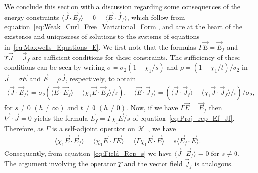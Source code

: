 \documentclass{cmslatex}
\begin{document}
We conclude this section with a discussion regarding some 
consequences of the energy constraints
$\langle\vec{J}\cdot\vec{E}_f\rangle=0=\langle\vec{E}\cdot\vec{J}_f\rangle$, which follow from
equation~\eqref{eq:Weak_Curl_Free_Variational_Form}, and are at the
heart of the existence and uniqueness of solutions to the systems of
equations in~\eqref{eq:Maxwells_Equations_E}. We first note that the
formulas $\Gamma\vec{E}=\vec{E}_f$ and $\Upsilon\vec{J}=\vec{J}_f$ are sufficient
conditions for these constraints. The sufficiency of these conditions
can be seen by writing $\sigma=\sigma_2(1-\chi_1/s)$ and $\rho=(1-\chi_1/t)/\sigma_2$ in
$\vec{J}=\sigma\vec{E}$ and $\vec{E}=\rho\vec{J}$, respectively, to obtain           
% 
\begin{align}\label{eq:Field_Rep_s}
  \langle\vec{J}\cdot\vec{E}_f\rangle=\sigma_2(\langle\vec{E}\cdot\vec{E}_f\rangle-\langle\chi_1\vec{E}\cdot\vec{E}_f\rangle/s),
 \quad
  \langle\vec{E}\cdot\vec{J}_f\rangle=(\langle\vec{J}\cdot\vec{J}_f\rangle-\langle\chi_1\vec{J}\cdot\vec{J}_f\rangle/t)/\sigma_2, 
\end{align}
%
for $s\neq0$ $(h\neq\infty)$ and $t\neq0$ $(h\neq0)$. Now, if we have
$\Gamma\vec{E}=\vec{E}_f$ then $\vec{\nabla}\cdot\vec{J}=0$ yields the formula
$\vec{E}_f=\Gamma\chi_1\vec{E}/s$ of
equation~\eqref{eq:Proj_rep_Ef_Jf}. Therefore, as $\Gamma$ is a
self-adjoint  operator on
$\mathscr{H}$~\cite{Golden:CMP-473,Stakgold:BVP:2000,Stone:64,Folland:95},
we have       
%
\begin{align}\label{eq:Suff_Cond}
  \langle\chi_1\vec{E}\cdot\vec{E}_f\rangle=\langle\chi_1\vec{E}\cdot\Gamma\vec{E}\rangle
                    =\langle\Gamma\chi_1\vec{E}\cdot\vec{E}\rangle
                    =s\langle\vec{E}_f\cdot\vec{E}\rangle.
\end{align}
%
Consequently, from equation~\eqref{eq:Field_Rep_s}
we have $\langle\vec{J}\cdot\vec{E}_f\rangle=0$ for $s\neq0$. The argument involving the
operator $\Upsilon$ and the vector field $\vec{J}_f$ is analogous.
\end{document}
